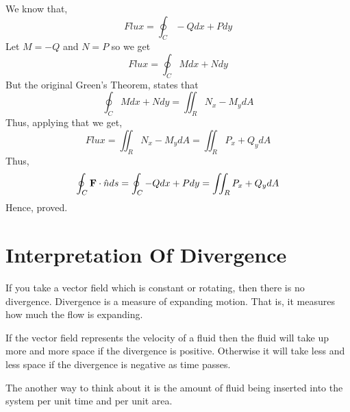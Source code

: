 We know that, 
$$ Flux = \oint_C -Q dx + P dy $$
Let $M = -Q$ and $N = P$ so we get
$$ Flux = \oint_C M dx + N dy $$
But the original Green's Theorem, states that
$$ \oint_C M dx + N dy = \iint_R N_x - M_y dA $$
Thus, applying that we get,
$$ Flux = \iint_R N_x - M_y dA = \iint_R P_x + Q_y dA $$
Thus, 
$$ \oint_C {\bf F} \cdot \hat{n} ds = \oint_C - Q dx + P dy = \iint_R P_x + Q_y dA $$
Hence, proved.

\section{Interpretation Of Divergence}

If you take a vector field which is constant or rotating, then there is no divergence.
Divergence is a measure of expanding motion. That is, it measures how much the flow is expanding.

If the vector field represents the velocity of a fluid then the fluid will take up more and more space if the divergence is positive.
Otherwise it will take less and less space if the divergence is negative as time passes.

The another way to think about it is the amount of fluid being inserted into the system per unit time and per unit area.
